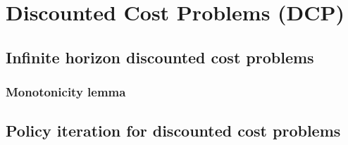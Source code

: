 \section{Discounted Cost Problems (DCP)}

\subsection{Infinite horizon discounted cost problems}

\subsubsection{Monotonicity lemma}

\subsection{Policy iteration for discounted cost problems}

